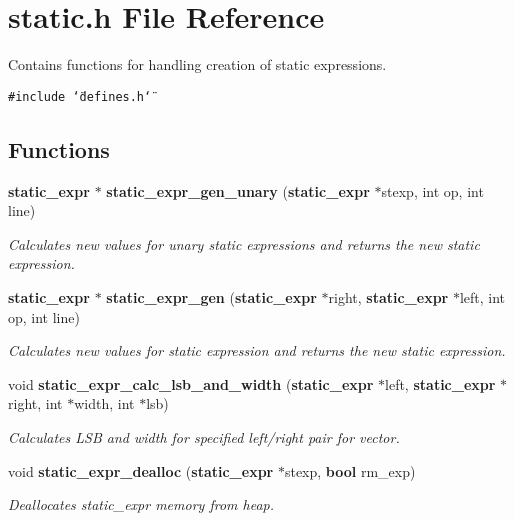 \section{static.h File Reference}
\label{static_8h}
Contains functions for handling creation of static expressions.  


{\tt \#include \char`\"{}defines.h\char`\"{}}\par
\subsection*{Functions}
\begin{CompactItemize}
\item 
{\bf static\_\-expr} $\ast$ {\bf static\_\-expr\_\-gen\_\-unary} ({\bf static\_\-expr} $\ast$stexp, int op, int line)
\begin{CompactList}\small\item\em Calculates new values for unary static expressions and returns the new static expression. \item\end{CompactList}\item 
{\bf static\_\-expr} $\ast$ {\bf static\_\-expr\_\-gen} ({\bf static\_\-expr} $\ast$right, {\bf static\_\-expr} $\ast$left, int op, int line)
\begin{CompactList}\small\item\em Calculates new values for static expression and returns the new static expression. \item\end{CompactList}\item 
void {\bf static\_\-expr\_\-calc\_\-lsb\_\-and\_\-width} ({\bf static\_\-expr} $\ast$left, {\bf static\_\-expr} $\ast$right, int $\ast$width, int $\ast$lsb)
\begin{CompactList}\small\item\em Calculates LSB and width for specified left/right pair for vector. \item\end{CompactList}\item 
void {\bf static\_\-expr\_\-dealloc} ({\bf static\_\-expr} $\ast$stexp, {\bf bool} rm\_\-exp)
\begin{CompactList}\small\item\em Deallocates static\_\-expr memory from heap. \item\end{CompactList}\end{CompactItemize}


